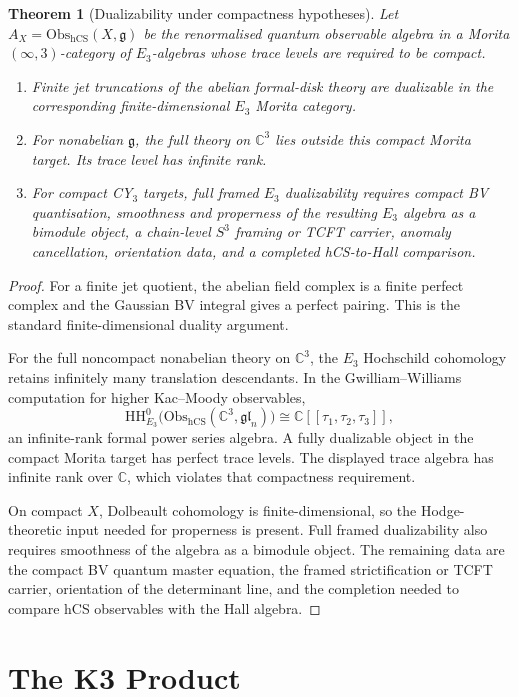 \documentclass[11pt]{amsart}
\providecommand{\C}{\mathbb{C}}
\providecommand{\Obs}{\mathrm{Obs}}
\providecommand{\hCS}{\mathrm{hCS}}
\providecommand{\g}{\mathfrak{g}}
\providecommand{\HH}{\mathrm{HH}}
\theoremstyle{plain}
\newtheorem{theorem}{Theorem}[section]
\theoremstyle{definition}
\theoremstyle{remark}
\begin{document}
\begin{theorem}[Dualizability under compactness hypotheses]\label{thm:dualizability-scope}
Let $A_X=\Obs_{\hCS}(X,\g)$ be the renormalised quantum observable
algebra in a Morita $(\infty,3)$-category of $E_3$-algebras whose trace
levels are required to be compact.
\begin{enumerate}
\item Finite jet truncations of the abelian formal-disk theory are
dualizable in the corresponding finite-dimensional $E_3$ Morita
category.
\item For nonabelian $\g$, the full theory on $\C^3$ lies outside this
compact Morita target. Its trace level has infinite rank.
\item For compact CY$_3$ targets, full framed $E_3$ dualizability
requires compact BV quantisation, smoothness and properness of the
resulting $E_3$ algebra as a bimodule object, a chain-level $S^3$
framing or TCFT carrier, anomaly cancellation, orientation data, and a
completed hCS-to-Hall comparison.
\end{enumerate}
\end{theorem}

\begin{proof}
For a finite jet quotient, the abelian field complex is a finite
perfect complex and the Gaussian BV integral gives a perfect pairing.
This is the standard finite-dimensional duality argument.

For the full noncompact nonabelian theory on $\C^3$, the $E_3$ Hochschild
cohomology retains infinitely many translation descendants. In the
Gwilliam--Williams computation for higher Kac--Moody observables,
\[
 \HH^0_{E_3}\bigl(\Obs_{\hCS}(\C^3,\mathfrak{gl}_n)\bigr)
 \cong \C[[\tau_1,\tau_2,\tau_3]],
\]
an infinite-rank formal power series algebra. A fully dualizable object
in the compact Morita target has perfect trace levels. The displayed
trace algebra has infinite rank over $\C$, which violates that
compactness requirement.

On compact $X$, Dolbeault cohomology is finite-dimensional, so the
Hodge-theoretic input needed for properness is present. Full framed
dualizability also requires smoothness of the algebra as a bimodule
object. The remaining data are the compact BV quantum master equation,
the framed strictification or TCFT carrier, orientation of the
determinant line, and the completion needed to compare hCS observables
with the Hall algebra.
\end{proof}

\section{The K3 Product}
\end{document}

